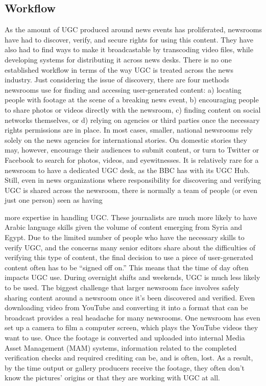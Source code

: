 \begin{enumerate}
\chapter{Workflow}
As the amount of UGC produced around news events has proliferated,
newsrooms have had to discover, verify, and secure rights for using this
content. They have also had to find ways to make it broadcastable by
transcoding video files, while developing systems for distributing it across
news desks.
There is no one established workflow in terms of the way UGC is treated
across the news industry. Just considering the issue of discovery, there are
four methods newsrooms use for finding and accessing user-generated content:
a) locating people with footage at the scene of a breaking news event,
b) encouraging people to share photos or videos directly with the newsroom,
c) finding content on social networks themselves, or d) relying on
agencies or third parties once the necessary rights permissions are in place.
In most cases, smaller, national newsrooms rely solely on the news agencies
for international stories. On domestic stories they may, however, encourage
their audiences to submit content, or turn to Twitter or Facebook to search
for photos, videos, and eyewitnesses.
It is relatively rare for a newsroom to have a dedicated UGC desk, as the
BBC has with its UGC Hub. Still, even in news organizations where responsibility
for discovering and verifying UGC is shared across the newsroom,
there is normally a team of people (or even just one person) seen as having

more expertise in handling UGC. These journalists are much more likely
to have Arabic language skills given the volume of content emerging from
Syria and Egypt.
Due to the limited number of people who have the necessary skills to verify
UGC, and the concerns many senior editors share about the difficulties of
verifying this type of content, the final decision to use a piece of user-generated
content often has to be ``signed off on.'' This means that the time of
day often impacts UGC use. During overnight shifts and weekends, UGC is
much less likely to be used.
The biggest challenge that larger newsroom face involves safely sharing
content around a newsroom once it's been discovered and verified. Even
downloading video from YouTube and converting it into a format that can
be broadcast provides a real headache for many newsrooms. One newsroom
has even set up a camera to film a computer screen, which plays
the YouTube videos they want to use. Once the footage is converted and
uploaded into internal Media Asset Management (MAM) systems, information
related to the completed verification checks and required crediting
can be, and is often, lost. As a result, by the time output or gallery producers
receive the footage, they often don't know the pictures' origins or that they
are working with UGC at all.

\end{enumerate}
